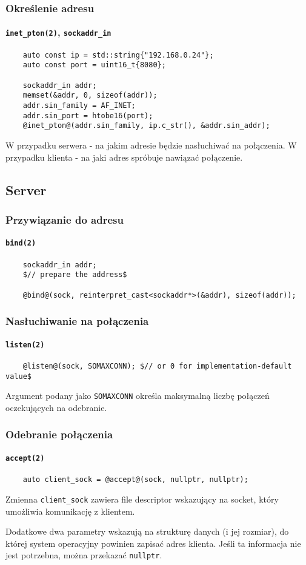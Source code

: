 \documentclass[aspectratio=169]{beamer}
\begin{document}
\begin{frame}[fragile]
    \frametitle{Określenie adresu}
    \framesubtitle{\texttt{inet\_pton(2)}, \texttt{sockaddr\_in}}

    {\footnotesize
    \begin{lstlisting}
    auto const ip = std::string{"192.168.0.24"};
    auto const port = uint16_t{8080};

    sockaddr_in addr;
    memset(&addr, 0, sizeof(addr));
    addr.sin_family = AF_INET;
    addr.sin_port = htobe16(port);
    @inet_pton@(addr.sin_family, ip.c_str(), &addr.sin_addr);
    \end{lstlisting}}

    W przypadku serwera - na jakim adresie będzie nasłuchiwać na połączenia.
    W przypadku klienta - na jaki adres spróbuje nawiązać połączenie.
\end{frame}

\subsection{Server}

\begin{frame}[fragile]
    \frametitle{Przywiązanie do adresu}
    \framesubtitle{\texttt{bind(2)}}

    {\footnotesize
    \begin{lstlisting}
    sockaddr_in addr;
    $// prepare the address$

    @bind@(sock, reinterpret_cast<sockaddr*>(&addr), sizeof(addr));
    \end{lstlisting}}
\end{frame}

\begin{frame}[fragile]
    \frametitle{Nasłuchiwanie na połączenia}
    \framesubtitle{\texttt{listen(2)}}

    {\footnotesize
    \begin{lstlisting}
    @listen@(sock, SOMAXCONN); $// or 0 for implementation-default value$
    \end{lstlisting}}

    Argument podany jako \texttt{SOMAXCONN} określa maksymalną liczbę połączeń
    oczekujących na odebranie.
\end{frame}

\begin{frame}[fragile]
    \frametitle{Odebranie połączenia}
    \framesubtitle{\texttt{accept(2)}}

    {\footnotesize
    \begin{lstlisting}
    auto client_sock = @accept@(sock, nullptr, nullptr);
    \end{lstlisting}}

    Zmienna \texttt{client\_sock} zawiera file descriptor wskazujący na socket,
    który umożliwia komunikację z klientem.

    Dodatkowe dwa parametry wskazują na strukturę danych (i jej rozmiar), do
    której system operacyjny powinien zapisać adres klienta. Jeśli ta informacja
    nie jest potrzebna, można przekazać \texttt{nullptr}.
\end{frame}
\end{document}

